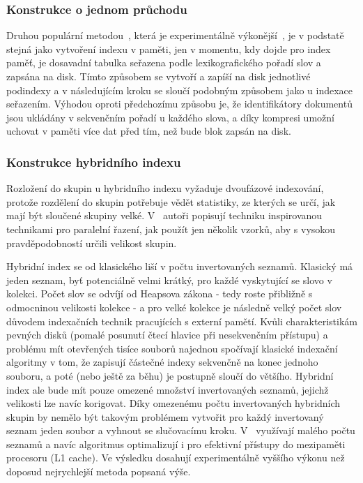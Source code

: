 \documentclass[11pt,letterpaper,oneside,openright]{book}
\begin{document}
\subsubsection{Konstrukce o jednom průchodu}
Druhou populární metodou~\citep[kap.~3]{Manning:2008:IIR:1394399}, která je
experimentálně výkonější~\cite{Heinz:2003:ESI:873988.873992}, je v podstatě
stejná jako vytvoření indexu v paměti, jen v momentu, kdy dojde pro index
paměť, je dosavadní tabulka seřazena podle lexikografického pořadí slov a
zapsána na disk. Tímto způsobem se vytvoří a zapíší na disk jednotlivé
podindexy a v následujícím kroku se sloučí podobným způsobem jako u indexace
seřazením. Výhodou oproti předchozímu způsobu je, že identifikátory dokumentů
jsou ukládány v sekvenčním pořadí u každého slova, a díky kompresi umožní
uchovat v paměti více dat před tím, než bude blok zapsán na disk.

\subsubsection{Konstrukce hybridního indexu}
Rozložení do skupin u hybridního indexu vyžaduje dvoufázové indexování, protože
rozdělení do skupin potřebuje vědět statistiky, ze kterých se určí, jak mají
být sloučené skupiny velké. V~\cite{Bast:2011:FCH:1993036.1993040} autoři
popisují techniku inspirovanou technikami pro paralelní řazení, jak použít jen
několik vzorků, aby s vysokou pravděpodobností určili velikost skupin.

Hybridní index se od klasického liší v počtu invertovaných seznamů. Klasický má
jeden seznam, byť potenciálně velmi krátký, pro každé vyskytující se slovo v
kolekci. Počet slov se odvíjí od Heapsova zákona - tedy roste přibližně s
odmocninou velikosti kolekce - a pro velké kolekce je následně velký počet slov
důvodem indexačních technik pracujících s externí pamětí. Kvůli
charakteristikám pevných disků (pomalé posunutí čtecí hlavice při nesekvenčním
přístupu) a problému mít otevřených tisíce souborů najednou spočívají klasické
indexační algoritmy v tom, že zapisují částečné indexy sekvenčně na konec
jednoho souboru, a poté (nebo ještě za běhu) je postupně sloučí do většího.
Hybridní index ale bude mít pouze omezené množství invertovaných seznamů,
jejichž velikosti lze navíc korigovat. Díky omezenému počtu invertovaných
hybridních skupin by nemělo být takovým problémem vytvořit pro každý
invertovaný seznam jeden soubor a vyhnout se slučovacímu kroku.
V~\cite{Bast:2011:FCH:1993036.1993040} využívají malého počtu seznamů a navíc
algoritmus optimalizují i pro efektivní přístupy do mezipaměti procesoru (L1
cache). Ve výsledku dosahují experimentálně vyššího výkonu než doposud
nejrychlejší metoda  popsaná výše.
\end{document}
